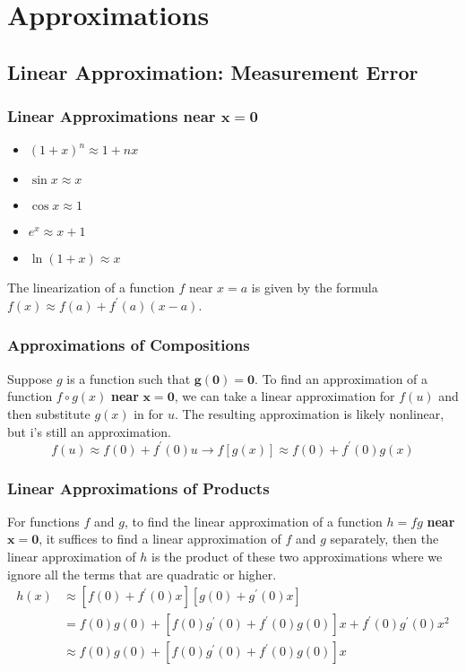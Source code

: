 \chapter{Approximations}
\section{Linear Approximation: Measurement Error}
\subsection{Linear Approximations near $\bm{x=0}$}
\begin{itemize}
\item$(1+x)^n\approx1+nx$
\item$\sin x\approx x$
\item$\cos x\approx1$
\item$e^x\approx x+1$
\item$\ln(1+x)\approx x$
\end{itemize}
\begin{note}[Recall]
The linearization of a function $f$ near $x=a$ is given by the formula $f(x)\approx f(a)+f^\prime (a)(x-a)$.
\end{note}

\subsection{Approximations of Compositions}
Suppose $g$ is a function such that $\bm{g(0)=0}$. To find an approximation of a function $f\circ g(x)$ \textbf{near} $\bm{x=0}$, we can take a linear approximation for $f(u)$ and then substitute $g(x)$ in for $u$. The resulting approximation is likely nonlinear, but i's still an approximation.
\[f(u)\approx f(0)+f^\prime(0)u\to f[g(x)]\approx f(0)+f^\prime(0)g(x)\]

\subsection{Linear Approximations of Products}
For functions $f$ and $g$, to find the linear approximation of a function $h=fg$ \textbf{near} $\bm{x=0}$, it suffices to find a linear approximation of $f$ and $g$ separately, then the linear approximation of $h$ is the product of these two approximations where we ignore all the terms that are quadratic or higher.
\begin{align*}
  h(x) & \approx[f(0)+f^\prime(0)x][g(0)+g^\prime(0)x]\\
  & =f(0)g(0)+[f(0)g^\prime(0)+f^\prime(0)g(0)]x+f^\prime(0)g^\prime(0)x^2\\
  & \approx f(0)g(0)+[f(0)g^\prime (0)+f^\prime (0)g(0)]x
\end{align*}

